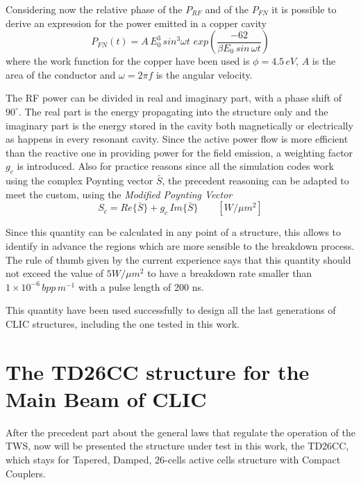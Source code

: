 Considering now the relative phase of the $P_{RF}$ and of the $P_{FN}$ it is possible to derive an expression for the power emitted in a copper cavity
\begin{equation}
P_{FN} (t) = A \, E^3_0 \, sin^3 \omega t \,  \, exp \left ( \frac{-62}{\beta E_0 \, sin \, \omega t} \right )
\end{equation}
where the work function for the copper have been used is $\phi = 4.5 \, eV$, $A$ is the area of the conductor and $\omega = 2 \pi f$ is the angular velocity.

The RF power can be divided in real and imaginary part, with a phase shift of $90^\circ$. The real part is the energy propagating into the structure only and the imaginary part is the energy stored in the cavity both magnetically or electrically as happens in every resonant cavity. Since the active power flow is more efficient than the reactive one in providing power for the field emission, a weighting factor $g_c$ is introduced. Also for practice reasons since all the simulation codes work using the complex Poynting vector $\bar{S}$, the precedent reasoning can be adapted to meet the custom, using the \textit{Modified Poynting Vector}
\begin{equation}
S_c = Re\{ \bar{S} \} + g_c \, Im \{ \bar{S} \} \qquad [W/\mu m^2]
\end{equation} 

Since this quantity can be calculated in any point of a structure, this allows to identify in advance the regions which are more sensible to the breakdown process. The rule of thumb given by the current experience says that this quantity should not exceed the value of $5 W/\mu m^2$ to have a breakdown rate smaller than $1\times 10^{-6} \, bpp \, m^{-1}$ with a pulse length of 200 ns.

This quantity have been used successfully to design all the last generations of CLIC structures, including the one tested in this work.






\section[The TD26CC structure for the Main Beam of CLIC]{The TD26CC structure for the Main Beam of CLIC}

After the precedent part about the general laws that regulate the operation of the TWS, now will be presented the structure under test in this work, the TD26CC, which stays for Tapered, Damped, 26-cells active cells structure with Compact Couplers.

